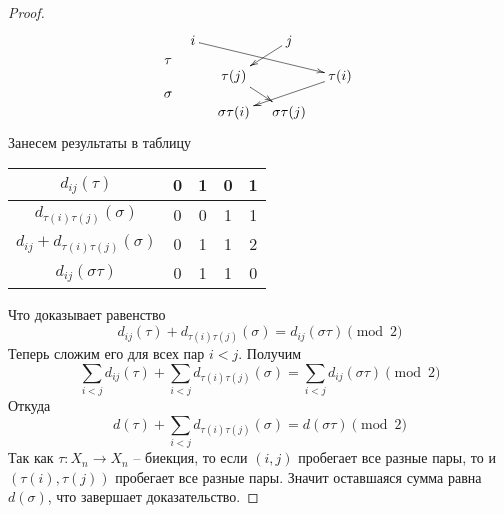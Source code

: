 \begin{proof}
\begin{align*}
{\begin{matrix}
{\tau}\\{}\\{\sigma}
\end{matrix}\quad
\begin{aligned}
\xymatrix@R=10pt@C=10pt{
	{i}\ar[drrr]&{}&{j}\ar[dl]&{}\\
	{}&{\tau(j)}\ar[dr]&{}&{\tau(i)}\ar[dll]\\
	{}&{\sigma\tau(i)}&{\sigma\tau(j)}&{}\\
}
\end{aligned}
}\\
\end{align*}
Занесем результаты в таблицу
\begin{center}
\begin{tabular}{|c|c|c|c|c|}
\hline
{$d_{ij}(\tau)$}&{0}&{1}&{0}&{1}\\
\hline
{$d_{\tau(i)\tau(j)}(\sigma)$}&{0}&{0}&{1}&{1}\\
\hline
{$d_{ij} + d_{\tau(i)\tau(j)}(\sigma)$}&{0}&{1}&{1}&{2}\\
\hline
{$d_{ij}(\sigma\tau)$}&{0}&{1}&{1}&{0}\\
\hline
\end{tabular}
\end{center}
Что доказывает равенство
\[
d_{ij}(\tau) + d_{\tau(i)\tau(j)}(\sigma) = d_{ij}(\sigma \tau) \pmod 2
\]
Теперь сложим его для всех пар $i < j$.
Получим
\[
\sum_{i<j}d_{ij}(\tau) + \sum_{i<j}d_{\tau(i)\tau(j)}(\sigma) = \sum_{i<j}d_{ij}(\sigma \tau) \pmod 2
\]
Откуда
\[
d(\tau) + \sum_{i<j}d_{\tau(i)\tau(j)}(\sigma) = d(\sigma \tau) \pmod 2
\]
Так как $\tau\colon X_n\to X_n$ -- биекция, то если $(i,j)$ пробегает все разные пары, то и $(\tau(i),\tau(j))$ пробегает все разные пары.
Значит оставшаяся сумма равна $d(\sigma)$, что завершает доказательство.
\end{proof}
